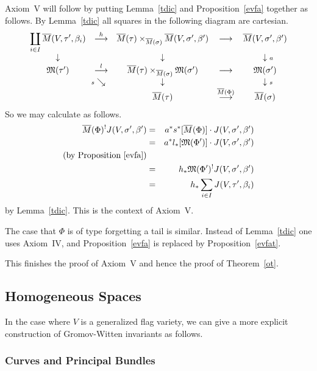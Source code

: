 \documentclass[11pt]{article}
\newcommand{\MM}{\mathfrak{M}}
\newcommand{\ldiag}[1]{\makebox[0cm]{\({\scriptstyle#1}\downarrow\phantom{\scriptstyle#1}\)}}
\newcommand{\lst}{_{\ast}}
\newcommand{\ol}{\overline}
\newcommand{\rdiag}[1]{\makebox[0cm]{\(\phantom{\scriptstyle#1}\downarrow{\scriptstyle#1}\)}}
\newcommand{\sediag}[1]{\makebox[0cm]{\({\scriptstyle#1}\searrow\phantom{\scriptstyle#1}\)}}
\newcommand{\upsh}{^{!}}
\newcommand{\upst}{^{\ast}}
\theoremstyle{plain}
\theoremstyle{remark}
\theoremstyle{plain}
\theoremstyle{definition}
\theoremstyle{remark}
\begin{document}
Axiom~V will follow by putting Lemma~\ref{tdic} and
Proposition~\ref{evfa} together as follows.
By Lemma~\ref{tdic} all squares in the following diagram are cartesian.
\[
\begin{array}{ccccc}
{\displaystyle\coprod_{i\in I}\ol{M}(V,\tau',\beta_i)}&
\stackrel{h}{\longrightarrow} &
\ol{M}(\tau)\times_{\ol{M}(\sigma)}\ol{M}(V,\sigma',\beta') &
\longrightarrow &
\ol{M}(V,\sigma',\beta') \\
\ldiag{} & & \ldiag{} & & \rdiag{a} \\
\MM(\tau') & \stackrel{l}{\longrightarrow} &
\ol{M}(\tau)\times_{\ol{M}(\sigma)}\MM(\sigma') &
\longrightarrow & \MM(\sigma')\\
& \sediag{s} & \ldiag{} & & \rdiag{s} \\
&&\ol{M}(\tau)& \stackrel{\ol{M}(\Phi)}{\longrightarrow} &
\ol{M}(\sigma) \end{array}
\]
So we may calculate as follows.
\begin{eqnarray*}
\ol{M}(\Phi)\upsh J(V,\sigma',\beta')  & = &
a\upst s\upst[\ol{M}(\Phi)]\cdot J(V,\sigma',\beta')\\
&=& a\upst l\lst[\MM(\Phi')]\cdot J(V,\sigma',\beta')\\
 \mbox{(by Proposition~\ref{evfa})}& & \\
&=& h\lst\MM(\Phi')\upsh J(V,\sigma',\beta')\\
&=& h\lst\sum_{i\in I} J(V,\tau',\beta_i)
\end{eqnarray*}
by Lemma~\ref{tdic}. This is the context of Axiom~V.

The case that \(\Phi\) is of type forgetting a tail is similar. Instead
of Lemma~\ref{tdic} one uses Axiom~IV, and Proposition~\ref{evfa} is
replaced by Proposition~\ref{evfat}.

This finishes the proof of
Axiom~V and hence the proof of Theorem~\ref{ot}.

\subsection{Homogeneous Spaces}

In the case where \(V\) is a generalized flag variety, we can give a
more explicit construction of Gromov-Witten invariants as follows.

\subsubsection{Curves and Principal Bundles}
\end{document}
